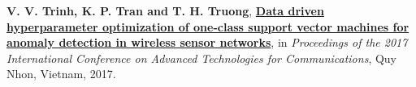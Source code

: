 \documentclass[a4paper,11pt]{article}
\begin{document}
	\vspace{0.2cm}
	
	\textbf{V. V. Trinh, K. P. Tran and T. H. Truong}, \href{https://doi.org/10.1109/ATC.2017.8167642}{\textbf{Data driven hyperparameter optimization of one-class support vector machines for anomaly detection in wireless sensor networks}}, in \emph{Proceedings of the 2017 International Conference on Advanced Technologies for Communications}, Quy Nhon, Vietnam, 2017. 

%	
%	
%	
%	
	
\end{document}
